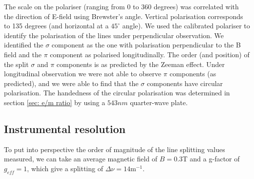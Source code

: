 \documentclass[11pt]{article}
\begin{document}
The scale on the polariser (ranging from 0 to 360 degrees) was correlated with the direction of E-field using Brewster's angle. Vertical polarisation corresponds to 135 degrees (and horizontal at a $45^\circ$ angle). We used the calibrated polariser to identify the polarisation of the lines under perpendicular observation. We identified the $\sigma$ component as the one with polarisation perpendicular to the B field and the $\pi$ component as polarised longitudinally. The order (and position) of the split $\sigma$ and $\pi$ components is as predicted by the Zeeman effect. Under longitudinal observation we were not able to observe $\pi$ components (as predicted), and we were able to find that the $\sigma$ components have circular polarisation. The handedness of the circular polarisation was determined in section \ref{sec: e/m ratio} by using a $543 \si{nm}$ quarter-wave plate. 

\subsection{Instrumental resolution}
To put into perspective the order of magnitude of the line splitting values measured, we can take an average magnetic field of $B = 0.3$T and a g-factor of $g_{eff}=1$, which give a splitting of $\Delta \nu = 14 \mathrm{m}^{-1}$. 
 
\end{document}
